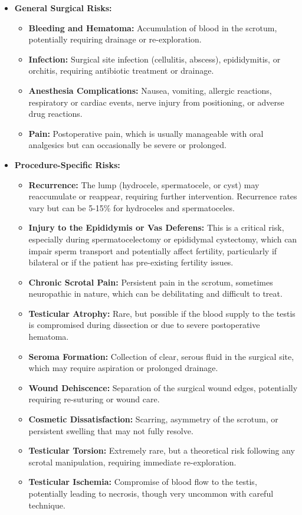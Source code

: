 \begin{itemize}
  \item \textbf{General Surgical Risks:}
    \begin{itemize}
      \item \textbf{Bleeding and Hematoma:} Accumulation of blood in the scrotum, potentially requiring drainage or re-exploration.
      \item \textbf{Infection:} Surgical site infection (cellulitis, abscess), epididymitis, or orchitis, requiring antibiotic treatment or drainage.
      \item \textbf{Anesthesia Complications:} Nausea, vomiting, allergic reactions, respiratory or cardiac events, nerve injury from positioning, or adverse drug reactions.
      \item \textbf{Pain:} Postoperative pain, which is usually manageable with oral analgesics but can occasionally be severe or prolonged.
    \end{itemize}
  \item \textbf{Procedure-Specific Risks:}
    \begin{itemize}
      \item \textbf{Recurrence:} The lump (hydrocele, spermatocele, or cyst) may reaccumulate or reappear, requiring further intervention. Recurrence rates vary but can be 5-15\% for hydroceles and spermatoceles.
      \item \textbf{Injury to the Epididymis or Vas Deferens:} This is a critical risk, especially during spermatocelectomy or epididymal cystectomy, which can impair sperm transport and potentially affect fertility, particularly if bilateral or if the patient has pre-existing fertility issues.
      \item \textbf{Chronic Scrotal Pain:} Persistent pain in the scrotum, sometimes neuropathic in nature, which can be debilitating and difficult to treat.
      \item \textbf{Testicular Atrophy:} Rare, but possible if the blood supply to the testis is compromised during dissection or due to severe postoperative hematoma.
      \item \textbf{Seroma Formation:} Collection of clear, serous fluid in the surgical site, which may require aspiration or prolonged drainage.
      \item \textbf{Wound Dehiscence:} Separation of the surgical wound edges, potentially requiring re-suturing or wound care.
      \item \textbf{Cosmetic Dissatisfaction:} Scarring, asymmetry of the scrotum, or persistent swelling that may not fully resolve.
      \item \textbf{Testicular Torsion:} Extremely rare, but a theoretical risk following any scrotal manipulation, requiring immediate re-exploration.
      \item \textbf{Testicular Ischemia:} Compromise of blood flow to the testis, potentially leading to necrosis, though very uncommon with careful technique.
    \end{itemize}
\end{itemize}

